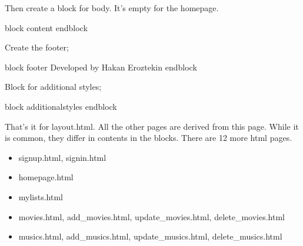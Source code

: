 \documentclass[letterpaper,10pt,english]{sphinxmanual}
\begin{document}
Then create a block for body. It’s empty for the homepage.

\begin{sphinxVerbatim}[commandchars=\\\{\}]
    \PYGZob{}\PYGZpc{} block content \PYGZpc{}\PYGZcb{}\PYGZob{}\PYGZpc{}  endblock \PYGZpc{}\PYGZcb{}
\end{sphinxVerbatim}

Create the footer;

\begin{sphinxVerbatim}[commandchars=\\\{\}]
\PYGZob{}   \PYGZpc{} block footer \PYGZpc{}\PYGZcb{}
 
    Developed by Hakan Eroztekin
\PYGZob{}\PYGZpc{} endblock \PYGZpc{}\PYGZcb{}
\end{sphinxVerbatim}

Block for additional styles;

\begin{sphinxVerbatim}[commandchars=\\\{\}]
\PYGZob{}\PYGZpc{} block additional\PYGZus{}styles \PYGZpc{}\PYGZcb{}
    
     
\PYGZob{}\PYGZpc{} endblock \PYGZpc{}\PYGZcb{}
\end{sphinxVerbatim}

That’s it for layout.html. All the other pages are derived from this page. While it is common, they differ in contents in the blocks.
There are 12 more html pages.
\begin{itemize}
\item {} 
 signup.html, signin.html

\item {} 
 homepage.html

\item {} 
 mylists.html

\item {} 
 movies.html, add\_movies.html, update\_movies.html, delete\_movies.html

\item {} 
 musics.html, add\_musics.html, update\_musics.html, delete\_musics.html

\end{itemize}
\end{document}
